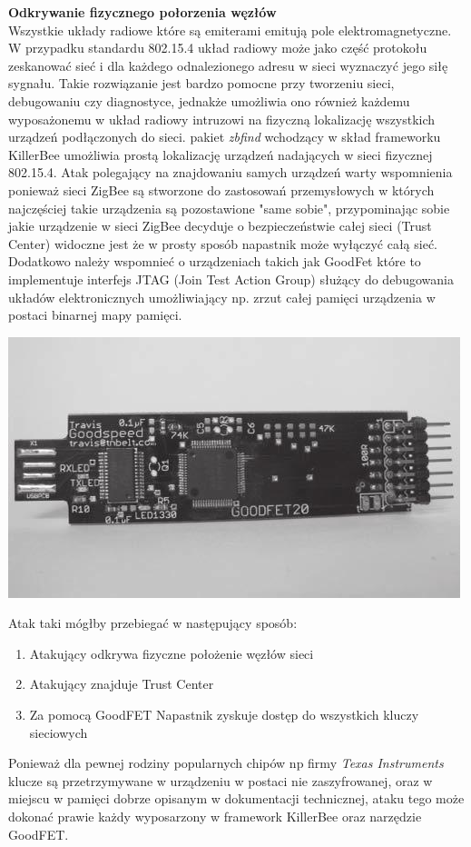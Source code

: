 \par
\tab \textbf{Odkrywanie fizycznego połorzenia węzłów} \\
Wszystkie układy radiowe które są emiterami emitują pole elektromagnetyczne. W przypadku standardu 802.15.4 układ radiowy może jako część protokołu zeskanować sieć i dla każdego odnalezionego adresu w sieci wyznaczyć jego siłę sygnału. Takie rozwiązanie jest bardzo pomocne przy tworzeniu sieci, debugowaniu czy diagnostyce, jednakże umożliwia ono również każdemu wyposażonemu w układ radiowy intruzowi na fizyczną lokalizację wszystkich urządzeń podłączonych do sieci. pakiet \textit{zbfind} wchodzący w skład frameworku KillerBee umożliwia prostą lokalizację urządzeń nadających w sieci fizycznej 802.15.4.
Atak polegający na znajdowaniu samych urządzeń warty wspomnienia ponieważ sieci ZigBee są stworzone do zastosowań przemysłowych w których najczęściej takie urządzenia są pozostawione "same sobie", przypominając sobie jakie urządzenie w sieci ZigBee decyduje o bezpieczeństwie całej sieci (Trust Center) widoczne jest że w prosty sposób napastnik może wyłączyć całą sieć. Dodatkowo należy wspomnieć o urządzeniach takich jak GoodFet które to implementuje interfejs JTAG (Join Test Action Group) służący do debugowania układów elektronicznych umożliwiający np. zrzut całej pamięci urządzenia w postaci binarnej mapy pamięci.
 \centerline{
	\includegraphics[scale=0.35]{./img/goodFet.jpeg}
}
Atak taki mógłby przebiegać w następujący sposób:
\begin{enumerate}
	\item Atakujący odkrywa fizyczne położenie węzłów sieci
	\item Atakujący znajduje Trust Center
	\item Za pomocą GoodFET Napastnik zyskuje dostęp do wszystkich kluczy sieciowych
\end{enumerate} 
Ponieważ dla pewnej rodziny popularnych chipów np firmy \textit{Texas Instruments} klucze są przetrzymywane w urządzeniu w postaci nie zaszyfrowanej, oraz w miejscu w pamięci dobrze opisanym w dokumentacji technicznej, ataku tego może dokonać prawie każdy wyposarzony w framework KillerBee oraz narzędzie GoodFET. \\

